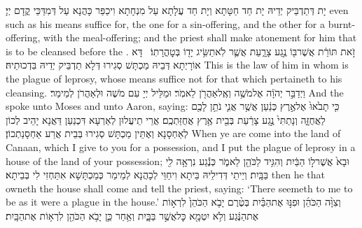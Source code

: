 {יָת דְּתַדְבֵּיק יְדֵיהּ יָת חַד חַטָּתָא וְיָת חַד עֲלָתָא עַל מִנְחָתָא וִיכַפַּר כָּהֲנָא עַל דְּמִדַּכֵּי קֳדָם יְיָ׃}
{even such as his means suffice for, the one for a sin-offering, and the other for a burnt-offering, with the meal-offering; and the priest shall make atonement for him that is to be cleansed before the \lord.}{}
{זֹ֣את תּוֹרַ֔ת אֲשֶׁר\maqqaf בּ֖וֹ נֶ֣גַע צָרָ֑עַת אֲשֶׁ֛ר לֹֽא\maqqaf תַשִּׂ֥יג יָד֖וֹ בְּטׇהֳרָתֽוֹ׃ \petucha }
{דָּא אוֹרָיְתָא דְּבֵיהּ מַכְתָּשׁ סְגִירוּ דְּלָא תַדְבֵּיק יְדֵיהּ בִּדְכוּתֵיהּ׃}
{This is the law of him in whom is the plague of leprosy, whose means suffice not for that which pertaineth to his cleansing.}{}
{וַיְדַבֵּ֣ר יְהֹוָ֔ה אֶל\maqqaf מֹשֶׁ֥ה וְאֶֽל\maqqaf אַהֲרֹ֖ן לֵאמֹֽר׃}
{וּמַלֵּיל יְיָ עִם מֹשֶׁה וּלְאַהֲרֹן לְמֵימַר׃}
{And the \lord\space spoke unto Moses and unto Aaron, saying:}{}
{כִּ֤י תָבֹ֙אוּ֙ אֶל\maqqaf אֶ֣רֶץ כְּנַ֔עַן אֲשֶׁ֥ר אֲנִ֛י נֹתֵ֥ן לָכֶ֖ם לַאֲחֻזָּ֑ה וְנָתַתִּי֙ נֶ֣גַע צָרַ֔עַת בְּבֵ֖ית אֶ֥רֶץ אֲחֻזַּתְכֶֽם׃}
{אֲרֵי תֵיעֲלוּן לְאַרְעָא דִּכְנַעַן דַּאֲנָא יָהֵיב לְכוֹן לְאַחְסָנָא וְאֶתֵּין מַכְתָּשׁ סְגִירוּ בְּבֵית אֲרַע אַחְסָנַתְכוֹן׃}
{When ye are come into the land of Canaan, which I give to you for a possession, and I put the plague of leprosy in a house of the land of your possession;}{}
{וּבָא֙ אֲשֶׁר\maqqaf ל֣וֹ הַבַּ֔יִת וְהִגִּ֥יד לַכֹּהֵ֖ן לֵאמֹ֑ר כְּנֶ֕גַע נִרְאָ֥ה לִ֖י בַּבָּֽיִת׃}
{וְיֵיתֵי דְּדִילֵיהּ בֵּיתָא וִיחַוֵּי לְכָהֲנָא לְמֵימַר כְּמַכְתָּשָׁא אִתַּחְזִי לִי בְּבֵיתָא׃}
{then he that owneth the house shall come and tell the priest, saying: ‘There seemeth to me to be as it were a plague in the house.’}{}
{וְצִוָּ֨ה הַכֹּהֵ֜ן וּפִנּ֣וּ אֶת\maqqaf הַבַּ֗יִת בְּטֶ֨רֶם יָבֹ֤א הַכֹּהֵן֙ לִרְא֣וֹת אֶת\maqqaf הַנֶּ֔גַע וְלֹ֥א יִטְמָ֖א כׇּל\maqqaf אֲשֶׁ֣ר בַּבָּ֑יִת וְאַ֥חַר כֵּ֛ן יָבֹ֥א הַכֹּהֵ֖ן לִרְא֥וֹת אֶת\maqqaf הַבָּֽיִת׃}
